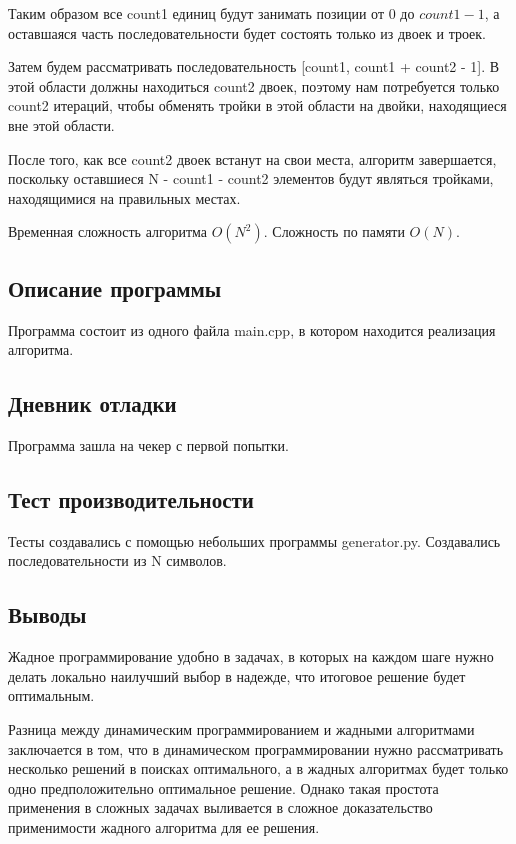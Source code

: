 \documentclass[12pt]{article}
\begin{document}
Таким образом все count1 единиц будут занимать позиции от 0 до $count1 - 1$, 
а оставшаяся часть последовательности будет состоять только из двоек и троек.

Затем будем рассматривать последовательность [count1, count1 + count2 - 1]. В этой области должны находиться count2 двоек, поэтому нам потребуется только count2 итераций, чтобы обменять тройки в этой области на двойки, находящиеся вне этой области. 

После того, как все count2 двоек встанут на свои места, алгоритм завершается, поскольку оставшиеся N - count1 - count2 элементов будут являться тройками, находящимися на правильных местах.

Временная сложность алгоритма $O(N^2)$. Сложность по памяти $O(N)$.

\subsection*{Описание программы}

Программа состоит из одного файла main.cpp, в котором находится реализация алгоритма.
\subsection*{Дневник отладки}

Программа зашла на чекер с первой попытки.

\subsection*{Тест производительности}

Тесты создавались с помощью небольших программы generator.py. Создавались последовательности из N символов.


\subsection*{Выводы}

Жадное программирование удобно в задачах, в которых на каждом шаге нужно делать локально наилучший выбор в надежде, что итоговое решение будет оптимальным.

Разница между динамическим программированием и жадными алгоритмами заключается в том, что в динамическом программировании нужно рассматривать несколько решений в поисках оптимального, а в жадных алгоритмах будет только одно предположительно оптимальное решение. Однако такая простота применения в сложных задачах выливается в сложное доказательство применимости жадного алгоритма для ее решения.
\end{document}
